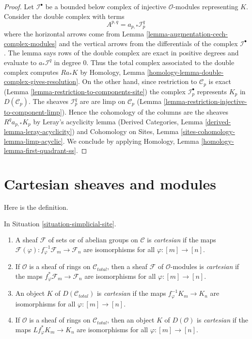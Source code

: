 \begin{proof}
Let $\mathcal{I}^\bullet$ be a bounded below complex of injective
$\mathcal{O}$-modules representing $K$. Consider the double complex with terms
$$
A^{p, q} = a_{p, *}\mathcal{I}^q_p
$$
where the horizontal arrows come from
Lemma \ref{lemma-augmentation-cech-complex-modules}
and the vertical arrows from the differentials of the
complex $\mathcal{I}^\bullet$. The lemma
says rows of the double complex are exact
in positive degrees and evaluate to
$a_*\mathcal{I}^q$ in degree $0$.
Thus the total complex associated to the double complex
computes $Ra_*K$ by
Homology, Lemma \ref{homology-lemma-double-complex-gives-resolution}.
On the other hand, since restriction to $\mathcal{C}_p$ is exact
(Lemma \ref{lemma-restriction-to-components-site})
the complex $\mathcal{I}_p^\bullet$ represents $K_p$ in
$D(\mathcal{C}_p)$. The sheaves $\mathcal{I}_p^q$ are
are limp on $\mathcal{C}_p$
(Lemma \ref{lemma-restriction-injective-to-component-limp}).
Hence the cohomology of the columns are the sheaves
$R^qa_{p, *}K_p$ by Leray's acyclicity lemma
(Derived Categories, Lemma \ref{derived-lemma-leray-acyclicity})
and
Cohomology on Sites, Lemma \ref{sites-cohomology-lemma-limp-acyclic}.
We conclude by applying
Homology, Lemma \ref{homology-lemma-first-quadrant-ss}.
\end{proof}





\section{Cartesian sheaves and modules}
\label{section-cartesian}

\noindent
Here is the definition.

\begin{definition}
\label{definition-cartesian-sheaf}
In Situation \ref{situation-simplicial-site}.
\begin{enumerate}
\item A sheaf $\mathcal{F}$ of sets or of abelian groups on
$\mathcal{C}$ is {\it cartesian} if the maps
$\mathcal{F}(\varphi) : f_\varphi^{-1}\mathcal{F}_m \to \mathcal{F}_n$
are isomorphisms for all $\varphi : [m] \to [n]$.
\item If $\mathcal{O}$ is a sheaf of rings on $\mathcal{C}_{total}$,
then a sheaf $\mathcal{F}$ of $\mathcal{O}$-modules is
{\it cartesian} if  the maps $f_\varphi^*\mathcal{F}_m \to \mathcal{F}_n$
are isomorphisms for all $\varphi : [m] \to [n]$.
\item An object $K$ of $D(\mathcal{C}_{total})$ is {\it cartesian} if the maps
$f_\varphi^{-1}K_m \to K_n$
are isomorphisms for all $\varphi : [m] \to [n]$.
\item If $\mathcal{O}$ is a sheaf of rings on $\mathcal{C}_{total}$, then
an object $K$ of $D(\mathcal{O})$ is {\it cartesian} if the maps
$Lf_\varphi^*K_m \to K_n$
are isomorphisms for all $\varphi : [m] \to [n]$.
\end{enumerate}
\end{definition}


